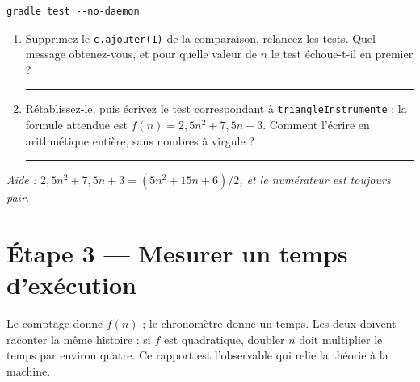 \documentclass[11pt,a4paper]{article}
\newcommand{\lig}[1]{\rule{#1}{0.4pt}}
\begin{document}
\begin{lstlisting}[style=bash]
gradle test --no-daemon
\end{lstlisting}

\begin{exercicebox}
\begin{enumerate}[nosep]
    \item Supprimez le \texttt{c.ajouter(1)} de la comparaison, relancez les
          tests. Quel message obtenez-vous, et pour quelle valeur de $n$ le
          test échoue-t-il en premier ? \lig{6cm}
    \item Rétablissez-le, puis écrivez le test correspondant à
          \texttt{triangleInstrumente} : la formule attendue est
          $f(n) = 2{,}5n^2 + 7{,}5n + 3$. Comment l'écrire en arithmétique
          entière, sans nombres à virgule ? \lig{6cm}
\end{enumerate}
\textit{Aide : $2{,}5n^2 + 7{,}5n + 3 = (5n^2 + 15n + 6)/2$, et le numérateur
est toujours pair.}
\end{exercicebox}

\section{Étape 3 --- Mesurer un temps d'exécution}

\begin{lienbox}[Ce qu'on matérialise du CM]
Le comptage donne $f(n)$ ; le chronomètre donne un temps. Les deux doivent
raconter la même histoire : si $f$ est quadratique, doubler $n$ doit
multiplier le temps par environ quatre. Ce rapport est l'observable qui
relie la théorie à la machine.
\end{lienbox}
\end{document}
